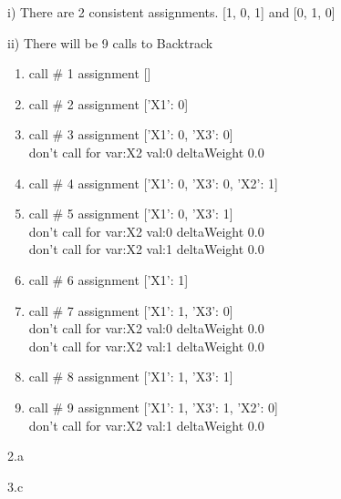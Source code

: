 \begin{answer}

i) There are 2 consistent assignments.  [1, 0, 1]  and [0, 1, 0]

ii)
There will be 9 calls to Backtrack
\begin{enumerate}
 \item call \# 1 assignment [{}]  
 \item call \# 2 assignment [{'X1': 0}]  
 \item call \# 3 assignment [{'X1': 0, 'X3': 0}]  
  \\ don't call for  var:X2 val:0  deltaWeight 0.0
 \item call \# 4 assignment [{'X1': 0, 'X3': 0, 'X2': 1}]  
 \item call \# 5 assignment [{'X1': 0, 'X3': 1}]  
  \\ don't call for  var:X2 val:0  deltaWeight 0.0
  \\ don't call for  var:X2 val:1  deltaWeight 0.0
 \item call \# 6 assignment [{'X1': 1}]  
 \item call \# 7 assignment [{'X1': 1, 'X3': 0}]  
  \\ don't call for  var:X2 val:0  deltaWeight 0.0
  \\ don't call for  var:X2 val:1  deltaWeight 0.0
 \item call \# 8 assignment [{'X1': 1, 'X3': 1}]  
 \item call \# 9 assignment [{'X1': 1, 'X3': 1, 'X2': 0}]  
  \\ don't call for  var:X2 val:1  deltaWeight 0.0
\end{enumerate}

\end{answer}
\clearpage

\LARGE
2.a
\normalsize

\begin{answer}
\end{answer}
\clearpage

\LARGE
3.c
\normalsize

\begin{answer}
\end{answer}
\clearpage



